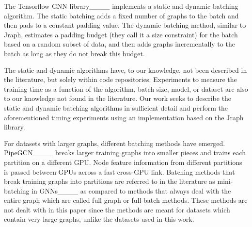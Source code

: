 The Tensorflow GNN library____ implements a static and dynamic batching algorithm. The static batching adds a fixed number of graphs to the batch and then pads to a constant padding value. The dynamic batching method, similar to Jraph, estimates a padding budget (they call it a size constraint) for the batch based on a random subset of data, and then adds graphs incrementally to the batch as long as they do not break this budget.

The static and dynamic algorithms have, to our knowledge, not been described in the literature, but solely within code repositories. Experiments to measure the training time as a function of the algorithm, batch size, model, or dataset are also to our knowledge not found in the literature. Our work seeks to describe the static and dynamic batching algorithms in sufficient detail and perform the aforementioned timing experiments using an implementation based on the Jraph library. 

For datasets with larger graphs, different batching methods have emerged. PipeGCN____ breaks larger training graphs into smaller pieces and trains each partition on a different GPU. Node feature information from different partitions is passed between GPUs across a fast cross-GPU link. Batching methods that break training graphs into partitions are referred to in the literature as mini-batching in GNNs____ as compared to methods that always deal with the entire graph which are called full graph or full-batch methods. These methods are not dealt with in this paper since the methods are meant for datasets which contain very large graphs, unlike the datasets used in this work.